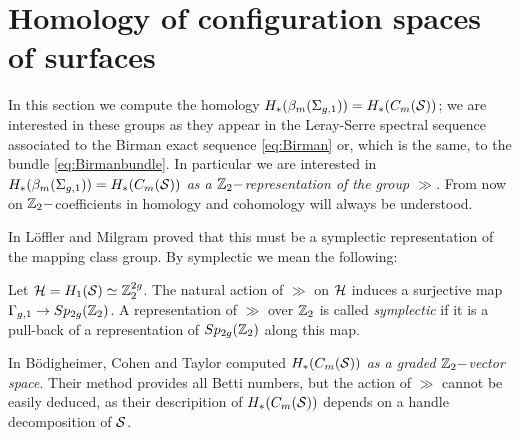 \section{Homology of configuration spaces of surfaces}
In this section we compute the homology $H_*(\bms)=H_*(C_m(\S))$; we
are interested in these groups as they appear in the Leray-Serre spectral sequence associated to
the Birman exact sequence \ref{eq:Birman} or, which is the same, to the bundle
\ref{eq:Birmanbundle}. In particular we are interested in $H_*(\bms)=H_*(C_m(\S))$
\emph{as a $\Z_2-$representation of the group $\gg$.} From now on $\Z_2-$coefficients in homology
and cohomology will always be understood.

In \cite{LM} L\"offler and Milgram proved that this must be a symplectic
representation of the mapping class group. By symplectic we mean the following:
\begin{defn}
 \label{def:symplrep}
 Let $\H=H_1(\S)\simeq\Z_2^{2g}$.
 The natural action of $\gg$ on $\H$ induces a surjective map
 $\gg\to Sp_{2g}(\Z_2)$. A representation of $\gg$ over $\Z_2$ is called \emph{symplectic}
 if it is a pull-back of a representation of $Sp_{2g}(\Z_2)$ along this map.
\end{defn}

In \cite{BCM} B\"odigheimer, Cohen and Taylor computed $H_*(C_m(\S))$ \emph{as a graded $\Z_2-$vector space}.
Their method provides all Betti numbers, but the action of $\gg$ cannot be easily deduced, as
their descripition of $H_*(C_m(\S))$ depends on a handle decomposition of $\S$.

